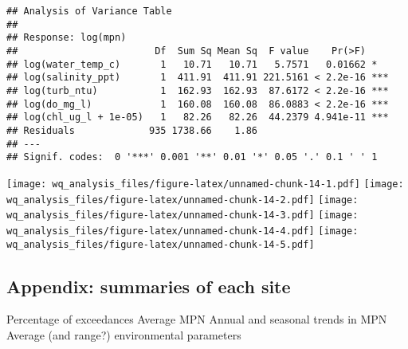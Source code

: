 \documentclass[
]{article}
\begin{document}
\begin{verbatim}
## Analysis of Variance Table
## 
## Response: log(mpn)
##                        Df  Sum Sq Mean Sq  F value    Pr(>F)    
## log(water_temp_c)       1   10.71   10.71   5.7571   0.01662 *  
## log(salinity_ppt)       1  411.91  411.91 221.5161 < 2.2e-16 ***
## log(turb_ntu)           1  162.93  162.93  87.6172 < 2.2e-16 ***
## log(do_mg_l)            1  160.08  160.08  86.0883 < 2.2e-16 ***
## log(chl_ug_l + 1e-05)   1   82.26   82.26  44.2379 4.941e-11 ***
## Residuals             935 1738.66    1.86                       
## ---
## Signif. codes:  0 '***' 0.001 '**' 0.01 '*' 0.05 '.' 0.1 ' ' 1
\end{verbatim}

\texttt{[image: wq\_analysis\_files/figure-latex/unnamed-chunk-14-1.pdf]}
\texttt{[image: wq\_analysis\_files/figure-latex/unnamed-chunk-14-2.pdf]}
\texttt{[image: wq\_analysis\_files/figure-latex/unnamed-chunk-14-3.pdf]}
\texttt{[image: wq\_analysis\_files/figure-latex/unnamed-chunk-14-4.pdf]}
\texttt{[image: wq\_analysis\_files/figure-latex/unnamed-chunk-14-5.pdf]}

\hypertarget{appendix-summaries-of-each-site}{%
\subsection{Appendix: summaries of each
site}\label{appendix-summaries-of-each-site}}

Percentage of exceedances Average MPN Annual and seasonal trends in MPN
Average (and range?) environmental parameters

\hypertarget{section}{%
\subsection{}\label{section}}
\end{document}
